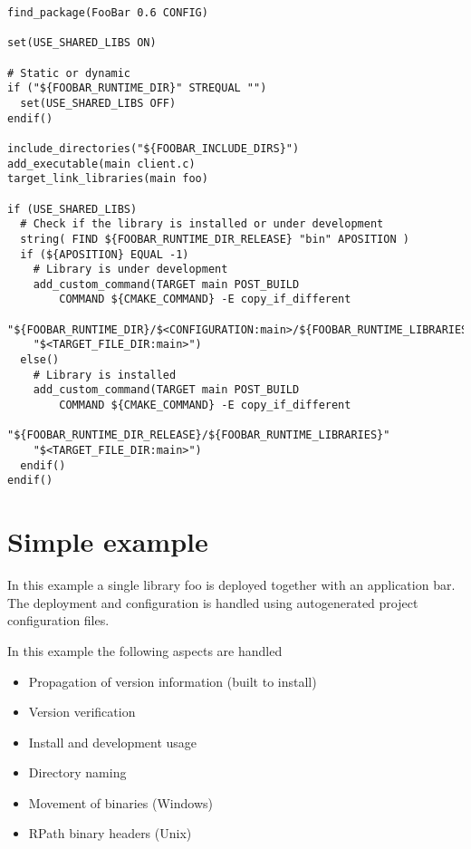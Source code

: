 \documentclass[12pt,a4wide]{article}
\begin{document}
\begin{lstlisting}[frame=single,title=Using a dynamic library foo from a package FooBar]
find_package(FooBar 0.6 CONFIG)

set(USE_SHARED_LIBS ON)

# Static or dynamic
if ("${FOOBAR_RUNTIME_DIR}" STREQUAL "")
  set(USE_SHARED_LIBS OFF)
endif()

include_directories("${FOOBAR_INCLUDE_DIRS}")
add_executable(main client.c)
target_link_libraries(main foo)

if (USE_SHARED_LIBS)
  # Check if the library is installed or under development
  string( FIND ${FOOBAR_RUNTIME_DIR_RELEASE} "bin" APOSITION )
  if (${APOSITION} EQUAL -1)
    # Library is under development
    add_custom_command(TARGET main POST_BUILD
        COMMAND ${CMAKE_COMMAND} -E copy_if_different
            "${FOOBAR_RUNTIME_DIR}/$<CONFIGURATION:main>/${FOOBAR_RUNTIME_LIBRARIES}"
    "$<TARGET_FILE_DIR:main>")
  else()
    # Library is installed
    add_custom_command(TARGET main POST_BUILD
        COMMAND ${CMAKE_COMMAND} -E copy_if_different
            "${FOOBAR_RUNTIME_DIR_RELEASE}/${FOOBAR_RUNTIME_LIBRARIES}"
    "$<TARGET_FILE_DIR:main>")
  endif()
endif()
\end{lstlisting}

\section{Simple example}
In this example a single library foo is deployed together with an
application bar. The deployment and configuration is handled using
autogenerated project configuration files.

In this example the following aspects are handled
\begin{itemize}
  \item Propagation of version information (built to install)
  \item Version verification
  \item Install and development usage
  \item Directory naming
  \item Movement of binaries (Windows)
  \item RPath binary headers (Unix)
\end{itemize}
\end{document}
